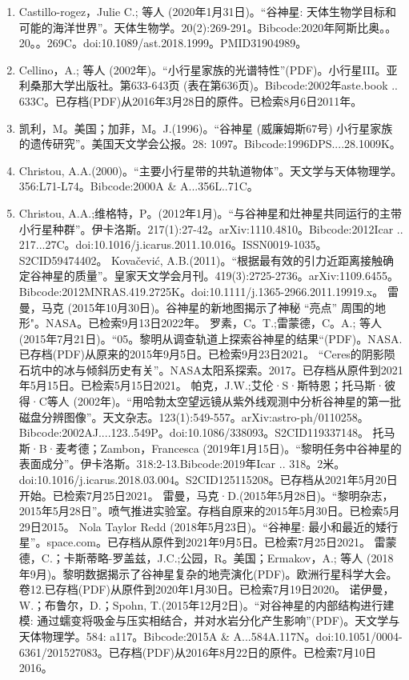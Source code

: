 \begin{enumerate}
\item Castillo-rogez，Julie C.; 等人 (2020年1月31日)。“谷神星: 天体生物学目标和可能的海洋世界”。天体生物学。20(2):269-291。Bibcode:2020年阿斯比奥。。20。。269C。doi:10.1089/ast.2018.1999。PMID31904989。 
\item Cellino，A.; 等人 (2002年)。“小行星家族的光谱特性”(PDF)。小行星III。亚利桑那大学出版社。第633-643页 (表在第636页)。Bibcode:2002年aste.book .. 633C。已存档(PDF)从2016年3月28日的原件。已检索8月6日2011年。
\item 凯利，M。美国；加菲，M。J.(1996)。“谷神星 (威廉姆斯67号) 小行星家族的遗传研究”。美国天文学会公报。28: 1097。Bibcode:1996DPS....28.1009K。
\item Christou, A.A.(2000)。“主要小行星带的共轨道物体”。天文学与天体物理学。356:L71-L74。Bibcode:2000A & A...356L..71C。
\item Christou, A.A.;维格特，P。(2012年1月)。“与谷神星和灶神星共同运行的主带小行星种群”。伊卡洛斯。217(1):27-42。arXiv:1110.4810。Bibcode:2012Icar .. 217...27C。doi:10.1016/j.icarus.2011.10.016。ISSN0019-1035。S2CID59474402。  
 Kovačević, A.B.(2011)。“根据最有效的引力近距离接触确定谷神星的质量”。皇家天文学会月刊。419(3):2725-2736。arXiv:1109.6455。Bibcode:2012MNRAS.419.2725K。doi:10.1111/j.1365-2966.2011.19919.x。
 雷曼，马克 (2015年10月30日)。谷神星的新地图揭示了神秘 “亮点” 周围的地形"。NASA。已检索9月13日2022年。
 罗素，C。T.;雷蒙德，C。A.; 等人 (2015年7月21日)。“05。黎明从调查轨道上探索谷神星的结果“(PDF)。NASA.已存档(PDF)从原来的2015年9月5日。已检索9月23日2021。
 “Ceres的阴影陨石坑中的冰与倾斜历史有关”。NASA太阳系探索。2017。已存档从原件到2021年5月15日。已检索5月15日2021。
 帕克，J.W.;艾伦·S·斯特恩；托马斯·彼得·C等人 (2002年)。“用哈勃太空望远镜从紫外线观测中分析谷神星的第一批磁盘分辨图像”。天文杂志。123(1):549-557。arXiv:astro-ph/0110258。Bibcode:2002AJ....123..549P。doi:10.1086/338093。S2CID119337148。 
 托马斯·B·麦考德；Zambon，Francesca (2019年1月15日)。“黎明任务中谷神星的表面成分”。伊卡洛斯。318:2-13.Bibcode:2019年Icar .. 318。2米。doi:10.1016/j.icarus.2018.03.004。S2CID125115208。已存档从2021年5月20日开始。已检索7月25日2021。 
 雷曼，马克·D.(2015年5月28日)。“黎明杂志，2015年5月28日”。喷气推进实验室。存档自原来的2015年5月30日。已检索5月29日2015。
 Nola Taylor Redd (2018年5月23日)。“谷神星: 最小和最近的矮行星”。space.com。已存档从原件到2021年9月5日。已检索7月25日2021。
 雷蒙德，C.；卡斯蒂略-罗盖兹，J.C.;公园，R。美国；Ermakov，A.; 等人 (2018年9月)。黎明数据揭示了谷神星复杂的地壳演化(PDF)。欧洲行星科学大会。卷12.已存档(PDF)从原件到2020年1月30日。已检索7月19日2020。
 诺伊曼，W.；布鲁尔，D.；Spohn, T.(2015年12月2日)。“对谷神星的内部结构进行建模: 通过蠕变将吸金与压实相结合，并对水岩分化产生影响”(PDF)。天文学与天体物理学。584: a117。Bibcode:2015A & A...584A.117N。doi:10.1051/0004-6361/201527083。已存档(PDF)从2016年8月22日的原件。已检索7月10日2016。

\end{enumerate}
